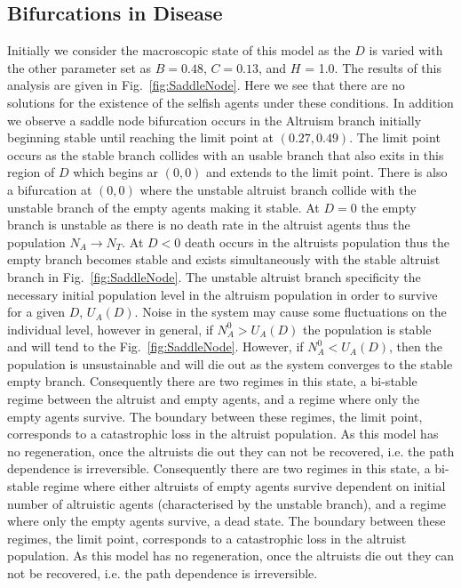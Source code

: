 \documentclass[11pt]{article}
\begin{document}
\subsection{Bifurcations in Disease}
\label{sec:disease}
Initially we consider the macroscopic state of this model as the $D$ is varied with the other parameter set as $B=0.48$, $C=0.13$, and $H$ = 1.0. The results of this analysis are given in Fig.~\ref{fig:SaddleNode}. Here we see that there are no solutions for the existence of the selfish agents under these conditions. In addition we observe a saddle node bifurcation occurs in the Altruism branch initially beginning stable until reaching the limit point at $(0.27,0.49)$. The limit point occurs as the stable branch collides with an usable branch that also exits in this region of $D$ which begins ar $(0,0)$ and extends to the limit point. There is also a bifurcation at $(0,0)$ where the unstable altruist branch collide with the unstable branch of the empty agents making it stable. At $D=0$ the empty branch is unstable as there is no death rate in the altruist agents thus the population $N_A \rightarrow N_T$. At $D<0$ death occurs in the altruists population thus the empty branch becomes stable and exists simultaneously with the stable altruist branch in Fig.~\ref{fig:SaddleNode}. The unstable altruist branch specificity the necessary initial population level in the altruism population in order to survive for a given $D$, $U_A(D)$. Noise in the system may cause some fluctuations on the individual level, however in general, if $N^0_A>U_A(D)$ the population is stable and will tend to the Fig.~\ref{fig:SaddleNode}. However, if $N^0_A<U_A(D)$, then the population is unsustainable and will die out as the system converges to the stable empty branch. Consequently there are two regimes in this state, a bi-stable regime between the altruist and empty agents, and a regime where only the empty agents survive. The boundary between these regimes, the limit point, corresponds to a catastrophic loss in the altruist population. As this model has no regeneration, once the altruists die out they can not be recovered, i.e. the path dependence is irreversible. Consequently there are two regimes in this state, a bi-stable regime where either altruists of empty agents survive dependent on initial number of altruistic agents (characterised by the unstable branch), and a regime where only the empty agents survive, a dead state. The boundary between these regimes, the limit point, corresponds to a catastrophic loss in the altruist population. As this model has no regeneration, once the altruists die out they can not be recovered, i.e. the path dependence is irreversible. 
\end{document}
